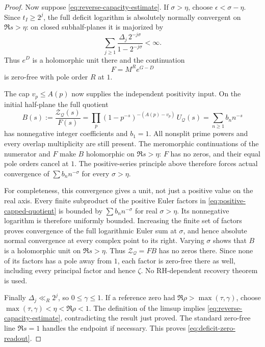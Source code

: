 \documentclass[11pt]{article}
\theoremstyle{definition}
\begin{document}
\begin{proof}
Now suppose \eqref{eq:reverse-capacity-estimate}. If $\sigma>\eta$,
choose $\epsilon<\sigma-\eta$. Since $t_I\ge2^j$, the full deficit
logarithm is absolutely normally convergent on $\Re s>\eta$:
on closed subhalf-planes it is majorized by
\[
 \sum_{j\ge1}\frac{\Delta_j\,2^{-j\sigma}}{1-2^{-j\sigma}}<\infty.
\]
Thus $e^D$ is a holomorphic unit there and the continuation
\[
                       F=M^R e^{G-D}
\]
is zero-free with pole order $R$ at $1$.

The cap $v_p\le A(p)$ now supplies the independent positivity
input. On the initial half-plane the full quotient
\begin{equation}
 B(s):=\frac{\mathcal Z_{\mathcal Q}(s)}{F(s)}
 =\prod_p(1-p^{-s})^{-(A(p)-v_p)}\,U_{\mathcal Q}(s)
 =\sum_{n\ge1}b_n n^{-s}
 \label{eq:positive-capped-quotient}
\end{equation}
has nonnegative integer coefficients and $b_1=1$.
All nonsplit prime powers and every overlap multiplicity are
still present. The meromorphic continuations of the numerator
and $F$ make $B$ holomorphic on $\Re s>\eta$:
$F$ has no zeros, and their equal pole orders cancel at $1$.
The positive-series principle above therefore forces actual
convergence of $\sum b_n n^{-\sigma}$ for every $\sigma>\eta$.

For completeness, this convergence gives a unit, not just a
positive value on the real axis. Every finite subproduct of the
positive Euler factors in \eqref{eq:positive-capped-quotient}
is bounded by $\sum b_n n^{-\sigma}$ for real $\sigma>\eta$.
Its nonnegative logarithm is therefore uniformly bounded.
Increasing the finite set of factors proves convergence of the
full logarithmic Euler sum at $\sigma$, and hence absolute normal
convergence at every complex point to its right. Varying $\sigma$
shows that $B$ is a holomorphic unit on $\Re s>\eta$.
Thus $\mathcal Z_{\mathcal Q}=FB$ has no zeros there.
Since none of its factors has a pole away from $1$, each factor
is zero-free there as well, including every principal factor
and hence $\zeta$. No RH-dependent recovery theorem is used.

Finally $\Delta_j\ll_R2^j$, so $0\le\gamma\le1$.
If a reference zero had $\Re\rho>\max(\tau,\gamma)$, choose
$\max(\tau,\gamma)<\eta<\Re\rho<1$. The definition of the
limsup implies \eqref{eq:reverse-capacity-estimate}, contradicting
the result just proved. The standard zero-free line $\Re s=1$
handles the endpoint if necessary. This proves
\eqref{eq:deficit-zero-readout}.
\end{proof}
\end{document}
